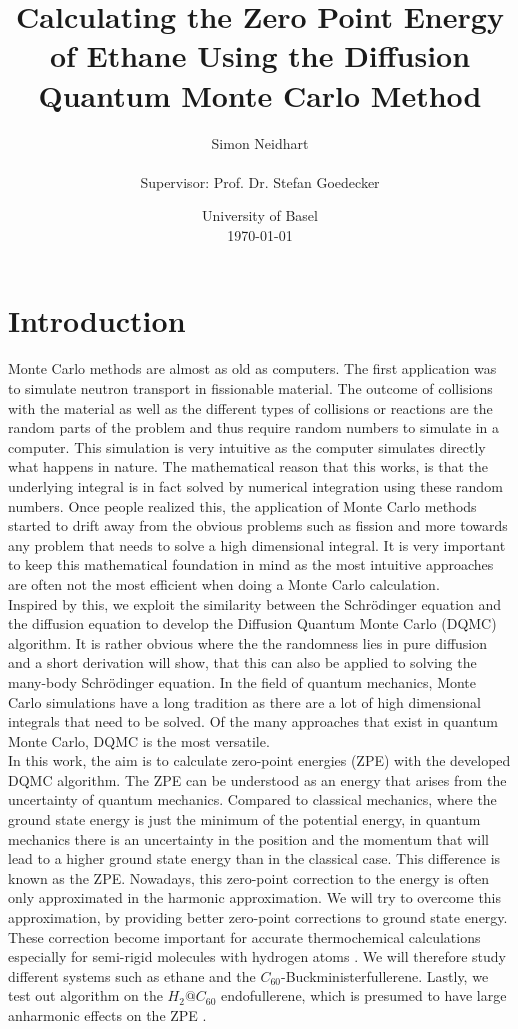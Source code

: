 \documentclass [12pt]{report}
\title{Calculating the Zero Point Energy of Ethane Using the Diffusion Quantum Monte Carlo Method}
\author{Simon Neidhart \\ \\ Supervisor: Prof. Dr. Stefan Goedecker}
\date{University of Basel \\ \today}
\begin{document}
\maketitle
\tableofcontents
\newpage
\chapter{Introduction}
Monte Carlo methods are almost as old as computers. The first application was to simulate neutron transport in fissionable material. The outcome of collisions with the material as well as the different types of collisions or reactions are the random parts of the problem and thus require random numbers to simulate in a computer. This simulation is very intuitive as the computer simulates directly what happens in nature. The mathematical reason that this works, is that the underlying integral is in fact solved by numerical integration using these random numbers. Once people realized this, the application of Monte Carlo methods started to drift away from the obvious problems such as fission and more towards any problem that needs to solve a high dimensional integral. It is very important to keep this mathematical foundation in mind as the most intuitive approaches are often not the most efficient when doing a Monte Carlo calculation.\\
Inspired by this, we exploit the similarity between the Schrödinger equation and the diffusion equation to develop the Diffusion Quantum Monte Carlo (DQMC) algorithm. It is rather obvious where the the randomness lies in pure diffusion and a short derivation will show, that this can also be applied to solving the many-body Schrödinger equation. In the field of quantum mechanics, Monte Carlo simulations have a long tradition as there are a lot of high dimensional integrals that need to be solved. Of the many approaches that exist in quantum Monte Carlo, DQMC is the most versatile.\\
In this work, the aim is to calculate zero-point energies (ZPE) with the developed DQMC algorithm. The ZPE can be understood as an energy that arises from the uncertainty of quantum mechanics. Compared to classical mechanics, where the ground state energy is just the minimum of the potential energy, in quantum mechanics there is an uncertainty in the position and the momentum that will lead to a higher ground state energy than in the classical case. This difference is known as the ZPE. Nowadays, this zero-point correction to the energy is often only approximated in the harmonic approximation. We will try to overcome this approximation, by providing better zero-point corrections to ground state energy. These correction become important for accurate thermochemical calculations especially for semi-rigid molecules with hydrogen atoms \cite{anharmonic}.
We will therefore study different systems such as ethane  and the $C_{60}$-Buckministerfullerene. Lastly, we test out algorithm on the $H_2@C_{60}$ endofullerene, which is presumed to have large anharmonic effects on the ZPE \cite{h2@c60}.
\end{document}

